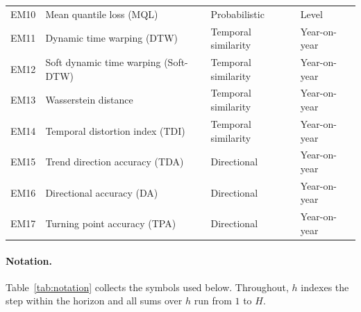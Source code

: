 \documentclass[12pt]{article}
\begin{document}
\begin{table}[htbp]
\begin{tabular}{llll}
EM10 & Mean quantile loss (MQL)                  & Probabilistic       & Level \\
EM11 & Dynamic time warping (DTW)                & Temporal similarity & Year-on-year \\
EM12 & Soft dynamic time warping (Soft-DTW)      & Temporal similarity & Year-on-year \\
EM13 & Wasserstein distance                      & Temporal similarity & Year-on-year \\
EM14 & Temporal distortion index (TDI)           & Temporal similarity & Year-on-year \\
EM15 & Trend direction accuracy (TDA)            & Directional         & Year-on-year \\
EM16 & Directional accuracy (DA)                 & Directional         & Year-on-year \\
EM17 & Turning point accuracy (TPA)              & Directional         & Year-on-year \\
\bottomrule
\end{tabular}
\end{table}

\paragraph{Notation.}
Table~\ref{tab:notation} collects the symbols used below. Throughout, $h$ indexes
the step within the horizon and all sums over $h$ run from $1$ to $H$.
\end{document}
